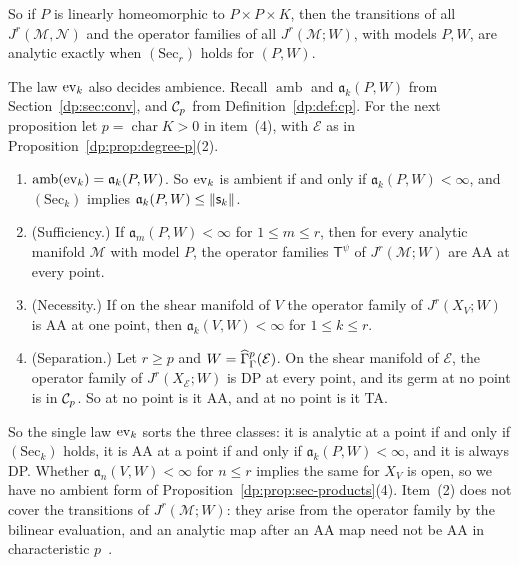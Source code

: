 So if $P$ is linearly homeomorphic to $P\times P\times K$, then the transitions of all $J^r(\mathcal M,\mathcal N)$ and the operator families of all $J^r(\mathcal M;W)$, with models $P,W$, are analytic exactly when $(\mathrm{Sec}_r)$ holds for $(P,W)$.

The law $\operatorname{ev}_k$ also decides ambience. Recall $\operatorname{amb}$ and $\mathfrak a_k(P,W)$ from Section~\ref{dp:sec:conv}, and $\mathcal{C}_p$ from Definition~\ref{dp:def:cp}. For the next proposition let $p=\operatorname{char}K>0$ in item~(4), with $\mathcal E$ as in Proposition~\ref{dp:prop:degree-p}(2).

\begin{proposition}\label{dp:prop:jets-not-ambient}
\leavevmode
\begin{enumerate}
\item $\operatorname{amb}(\operatorname{ev}_k)=\mathfrak a_k(P,W)$. So $\operatorname{ev}_k$ is ambient if and only if $\mathfrak a_k(P,W)<\infty$, and $(\mathrm{Sec}_k)$ implies $\mathfrak a_k(P,W)\le\lVert \mathsf s_k\rVert$.
\item \textup{(Sufficiency.)} If $\mathfrak a_m(P,W)<\infty$ for $1\le m\le r$, then for every analytic manifold $\mathcal M$ with model $P$, the operator families $\mathsf T^\psi$ of $J^r(\mathcal M;W)$ are AA at every point.
\item \textup{(Necessity.)} If on the shear manifold of $V$ the operator family of $J^r(X_V;W)$ is AA at one point, then $\mathfrak a_k(V,W)<\infty$ for $1\le k\le r$.
\item \textup{(Separation.)} Let $r\ge p$ and $W=\widehat\Gamma^p_\Gamma(\mathcal E)$. On the shear manifold of $\mathcal E$, the operator family of $J^r(X_{\mathcal E};W)$ is DP at every point, and its germ at no point is in $\mathcal{C}_p$. So at no point is it AA, and at no point is it TA.
\end{enumerate}
\end{proposition}

So the single law $\operatorname{ev}_k$ sorts the three classes: it is analytic at a point if and only if $(\mathrm{Sec}_k)$ holds, it is AA at a point if and only if $\mathfrak a_k(P,W)<\infty$, and it is always DP. Whether $\mathfrak a_n(V,W)<\infty$ for $n\le r$ implies the same for $X_V$ is open, so we have no ambient form of Proposition~\ref{dp:prop:sec-products}(4). Item~(2) does not cover the transitions of $J^r(\mathcal M;W)$: they arise from the operator family by the bilinear evaluation, and an analytic map after an AA map need not be AA in characteristic $p$~\cite[Theorem~14.17]{I}.

